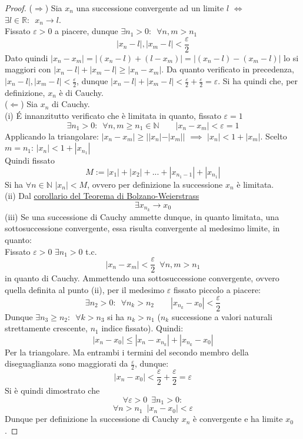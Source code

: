 \documentclass[10pt, oneside]{book}
\theoremstyle{plain}
\begin{document}
\begin{proof}
($\Rightarrow$) Sia $x_n$ una successione convergente ad un limite $l$ $\Longleftrightarrow$ $\exists l \in \mathbb{R} : \enspace x_n \rightarrow l$. \\Fissato $\varepsilon > 0$ a piacere, dunque $\exists n_1 > 0 : \enspace \forall n,m > n_1$
\[|x_n - l|, |x_m - l| < \frac{\varepsilon}{2}\]
Dato quindi $|x_n - x_m| = |(x_n - l) + (l - x_m)| = |(x_n - l) - (x_m -l)|$ lo si maggiori con $|x_n - l| + |x_m - l| \geq |x_n - x_m|$. Da quanto verificato in precedenza, $|x_n - l|, |x_m - l| < \frac{\varepsilon}{2}$, dunque $\displaystyle |x_n - l| + |x_m - l| < \frac{\varepsilon}{2} + \frac{\varepsilon}{2} = \varepsilon$. Si ha quindi che, per definizione, $x_n$ è di Cauchy.
\\($\Leftarrow$) Sia $x_n$ di Cauchy.\\
(i) \'E innanzitutto verificato che è limitata in quanto, fissato $\varepsilon = 1$
\[\exists n_1 > 0 : \enspace \forall n,m \geq n_1 \in \mathbb{N} \qquad |x_n - x_m| < \varepsilon = 1 \]
Applicando la triangolare: $|x_n - x_m| \geq ||x_n| - |x_m||$ $\implies$ $|x_n| < 1 + |x_m|$. Scelto $m = n_1$: $|x_n| < 1 + |x_{n_1}|$\\
Quindi fissato 
\[M := |x_1| + |x_2| + ... + |x_{n_1 - 1}| + |x_{n_1}|\]
Si ha $\forall n \in \mathbb{N}$ $|x_n| < M$, ovvero per definizione la successione $x_n$ è limitata.\\
(ii) Dal \hyperlink{corollaier}{corollario del Teorema di Bolzano-Weierstrass} \[\exists x_{n_k} \longrightarrow x_0\]
(iii) Se una successione di Cauchy ammette dunque, in quanto limitata, una sottosuccessione convergente, essa risulta convergente al medesimo limite, in quanto:\\
Fissato $\varepsilon > 0$ $\exists n_1 > 0$ t.c.
\[|x_n - x_m| < \frac{\varepsilon}{2} \enspace \forall n, m > n_1\]
in quanto di Cauchy. Ammettendo una sottosuccessione convergente, ovvero quella definita al punto (ii), per il medesimo $\varepsilon$ fissato piccolo a piacere:
\[\exists n_2 > 0 : \enspace \forall n_k > n_2 \qquad |x_{n_k} - x_0| < \frac{\varepsilon}{2}\]
Dunque $\exists n_3 \geq n_2 : \enspace \forall k > n_3$ si ha $n_k > n_1$ ($n_k$ successione a valori naturali strettamente crescente, $n_1$ indice fissato). Quindi:
\[|x_n - x_0| \leq |x_n - x_{n_k}| + |x_{n_k} - x_0|\]
Per la triangolare. Ma entrambi i termini del secondo membro della diseguaglianza sono maggiorati da $\displaystyle \frac{\varepsilon}{2}$, dunque:
\[|x_n - x_0| < \frac{\varepsilon}{2} + \frac{\varepsilon}{2} = \varepsilon\]
Si è quindi dimostrato che 
\[\forall \varepsilon > 0 \enspace \exists n_1 > 0 :\]
\[\forall n > n_1 \enspace |x_n - x_0| < \varepsilon\]
Dunque per definizione la successione di Cauchy $x_n$ è convergente e ha limite $x_0$.
\end{proof}
\end{document}
